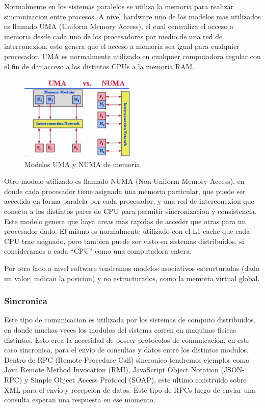 \documentclass{article}
\begin{document}
Normalmente en los sistemas paralelos se utiliza la memoria para realizar sincronizacion entre procesos. A nivel hardware uno de los modelos mas utilizados es llamado UMA (Uniform Memory Access), el cual centraliza el acceso a memoria desde cada uno de los procesadores por medio de una red de interconexion, esto genera que el acceso a memoria sea igual para cualquier procesador. UMA es normalmente utilizado en cualquier computadora regular con el fin de dar acceso a los distintos CPUs a la memoria RAM. 

\begin{figure}[H]
    \centering
    \includegraphics[width=0.5\textwidth]{imgs/numa_uma.png}
    \caption{Modelos UMA y NUMA de memoria.}
    \label{fig:numa_uma}
\end{figure}

Otro modelo utilizado es llamado NUMA (Non-Uniform Memory Access), en donde cada procesador tiene asignada una memoria particular, que puede ser accedida en forma paralela por cada procesador, y una red de interconexion que conecta a los distintos pares de CPU para permitir sincronizacion y consistencia. Este modelo genera que haya areas mas rapidas de acceder que otras para un procesador dado. El mismo es normalmente utilizado con el L1 cache que cada CPU trae asignado, pero tambien puede ser visto en sistemas distribuidos, si consideramos a cada ``CPU'' como una computadora entera.

Por otro lado a nivel software tendremos modelos asociativos estructurados (dado un valor, indican la posicion) y no estructurados, como la memoria virtual global.

\subsubsection{Sincronica}

Este tipo de comunicacion es utilizada por los sistemas de computo distribuidos, en donde muchas veces los modulos del sistema corren en maquinas fisicas distintas. Esto crea la necesidad de poseer protocolos de comunicacion, en este caso sincronica, para el envio de consultas y datos entre los distintos modulos. Dentro de RPC (Remote Procedure Call) sincronico tendremos ejemplos como Java Remote Method Invocation (RMI), JavaScript Object Notation (JSON-RPC) y Simple Object Access Protocol (SOAP), este ultimo construido sobre XML para el envio y recepcion de datos. Este tipo de RPCs luego de enviar una consulta esperan una respuesta en ese momento.
\end{document}
